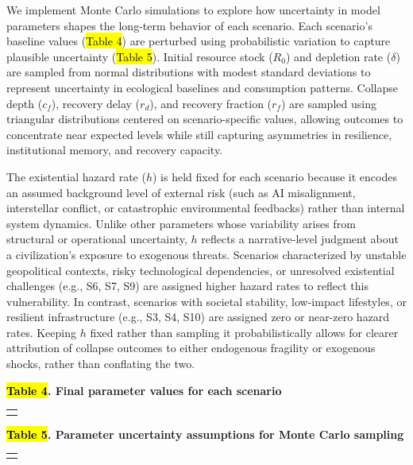 We implement Monte Carlo simulations to explore how uncertainty in model parameters shapes the long-term behavior of each scenario. Each scenario's baseline values (\hl{Table 4}) are perturbed using probabilistic variation to capture plausible uncertainty (\hl{Table 5}). Initial resource stock (\(R_{0}\)) and depletion rate (\(\delta\)) are sampled from normal distributions with modest standard deviations to represent uncertainty in ecological baselines and consumption patterns. Collapse depth (\(c_{f}\)), recovery delay (\(r_{d}\)), and recovery fraction (\(r_{f}\)) are sampled using triangular distributions centered on scenario-specific values, allowing outcomes to concentrate near expected levels while still capturing asymmetries in resilience, institutional memory, and recovery capacity.

The existential hazard rate (\(h\)) is held fixed for each scenario because it encodes an assumed background level of external risk (such as AI misalignment, interstellar conflict, or catastrophic environmental feedbacks) rather than internal system dynamics. Unlike other parameters whose variability arises from structural or operational uncertainty, \(h\) reflects a narrative-level judgment about a civilization's exposure to exogenous threats. Scenarios characterized by unstable geopolitical contexts, risky technological dependencies, or unresolved existential challenges (e.g., S6, S7, S9) are assigned higher hazard rates to reflect this vulnerability. In contrast, scenarios with societal stability, low-impact lifestyles, or resilient infrastructure (e.g., S3, S4, S10) are assigned zero or near-zero hazard rates. Keeping \(h\) fixed rather than sampling it probabilistically allows for clearer attribution of collapse outcomes to either endogenous fragility or exogenous shocks, rather than conflating the two.

\textbf{\hl{Table 4}. Final parameter values for each scenario}

{\def\LTcaptype{none} %
\begin{longtable}[]{@{}l@{}}
\toprule\noalign{}
\endhead
\bottomrule\noalign{}
\endlastfoot
\end{longtable}
}

\textbf{\hl{Table 5}. Parameter uncertainty assumptions for Monte Carlo sampling}

{\def\LTcaptype{none} %
\begin{longtable}[]{@{}l@{}}
\toprule\noalign{}
\endhead
\bottomrule\noalign{}
\endlastfoot
\end{longtable}
}

